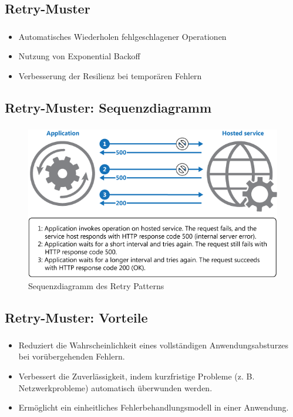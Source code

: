 \subsection{\textbf{Retry-Muster}}
\begin{frame}
    \frametitle{\insertsection}
    \framesubtitle{\insertsubsection}

    \begin{itemize}
        \item Automatisches Wiederholen fehlgeschlagener Operationen
        \item Nutzung von Exponential Backoff
        \item Verbesserung der Resilienz bei temporären Fehlern
    \end{itemize}
\end{frame}

\subsection{Retry-Muster: Sequenzdiagramm}
\begin{frame}
    \frametitle{\insertsection}
    \framesubtitle{\insertsubsection}

    \begin{figure}[h]
        \centering
        \includegraphics[height=0.5\textheight]{../images/retry-pattern}
        \caption{Sequenzdiagramm des Retry Patterns}
    \end{figure}
\end{frame}

\subsection{Retry-Muster: Vorteile}
\begin{frame}
    \frametitle{\insertsection}
    \framesubtitle{\insertsubsection}

    \begin{itemize}
    \item Reduziert die Wahrscheinlichkeit eines vollständigen Anwendungsabsturzes bei vorübergehenden Fehlern.
    \item Verbessert die Zuverlässigkeit, indem kurzfristige Probleme (z. B. Netzwerkprobleme) automatisch überwunden werden.
    \item Ermöglicht ein einheitliches Fehlerbehandlungsmodell in einer Anwendung.
\end{itemize}
\end{frame}

